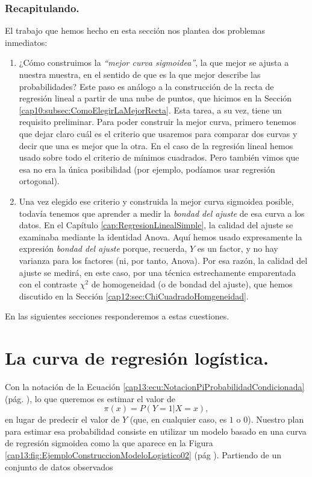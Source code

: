 \subsubsection*{Recapitulando.}

\noindent El trabajo que hemos hecho en esta sección nos plantea dos problemas inmediatos:
\begin{enumerate}

   \item ¿Cómo construimos la {\em ``mejor curva sigmoidea''}, la que mejor se ajusta a nuestra muestra, en el sentido de que es la que mejor describe las probabilidades? Este paso es análogo a la
       construcción de la recta de regresión lineal a partir de una nube de puntos, que hicimos
       en la Sección \ref{cap10:subsec:ComoElegirLaMejorRecta}. Esta tarea, a su vez, tiene un requisito preliminar. Para poder construir la mejor curva, primero tenemos que dejar claro cuál es el criterio que usaremos para comparar dos curvas y decir que una es mejor que la otra. En el caso de la regresión lineal hemos usado sobre todo el criterio de mínimos cuadrados. Pero también vimos que esa no era la única posibilidad (por ejemplo, podíamos usar regresión ortogonal).

   \item Una vez elegido ese criterio y construida la mejor curva sigmoidea posible, todavía tenemos que aprender a  medir la {\em bondad del ajuste} de esa curva a los datos. En el Capítulo       \ref{cap:RegresionLinealSimple}, la calidad del ajuste se examinaba mediante la identidad Anova. Aquí hemos usado expresamente la expresión {\em bondad del ajuste} porque,  recuerda, $Y$ es un factor, y no hay varianza para los factores (ni, por tanto, Anova). Por esa razón, la calidad del ajuste se medirá, en este caso, por  una técnica estrechamente emparentada con el contraste $\chi^2$ de homogeneidad (o de bondad del ajuste), que hemos discutido en la Sección \ref{cap12:sec:ChiCuadradoHomgeneidad}.

 \end{enumerate}
En las siguientes secciones responderemos a estas cuestiones.

\section{La curva de regresión logística.}
\label{cap13:sec:CurvaLogistica}

Con la notación de la Ecuación \ref{cap13:ecu:NotacionPiProbabilidadCondicionada} (pág. \pageref{cap13:ecu:NotacionPiProbabilidadCondicionada}), lo que queremos es estimar el valor de
\[
\pi(x)=P(Y=1|X=x),
\]
en lugar de predecir el valor de $Y$ (que, en cualquier caso, es $1$ o $0$).
Nuestro plan para estimar esa probabilidad consiste en utilizar un modelo basado en una curva de regresión sigmoidea como la que aparece en la Figura \ref{cap13:fig:EjemploConstruccionModeloLogistico02}
(pág \pageref{cap13:fig:EjemploConstruccionModeloLogistico02}). Partiendo de un conjunto de datos observados

